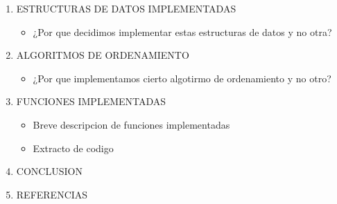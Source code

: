 \begin{enumerate}
    \item ESTRUCTURAS DE DATOS IMPLEMENTADAS
        \begin{itemize}
            \item ¿Por que decidimos implementar estas estructuras de datos y no otra?
        \end{itemize}
    \item ALGORITMOS DE ORDENAMIENTO
        \begin{itemize}
            \item ¿Por que implementamos cierto algotirmo de ordenamiento y no otro?
        \end{itemize}
    \item FUNCIONES IMPLEMENTADAS
        \begin{itemize}
            \item Breve descripcion de funciones implementadas
            \item Extracto de codigo
        \end{itemize}
    \item CONCLUSION
    \item REFERENCIAS
\end{enumerate}